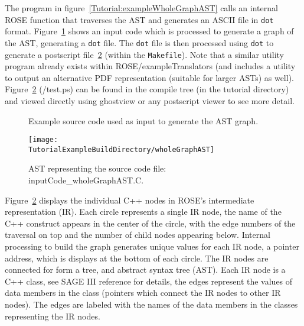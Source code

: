The program in figure~\ref{Tutorial:exampleWholeGraphAST} calls 
an internal ROSE function that traverses the AST and generates 
an ASCII file in {\tt dot} format.
Figure~\ref{Tutorial:exampleInputCode_WholeGraphAST} shows an input
code which is processed to generate a graph of the AST, generating a 
{\tt dot} file.   The {\tt dot} file is then processed
using {\tt dot} to generate a postscript file~\ref{tutorial:exampleOutputWholeGraphAST}
(within the {\tt Makefile}).
Note that a similar utility program already exists within ROSE/exampleTranslators
(and includes a utility to output an alternative PDF representation 
(suitable for larger ASTs) as well).  Figure~\ref{tutorial:exampleOutputWholeGraphAST}
(\TutorialExampleBuildDirectory/test.ps) can be found in the compile 
tree (in the tutorial directory) and viewed directly using ghostview 
or any postscript viewer to see more detail.


\begin{figure}[!h]
{\indent
{\mySmallFontSize

\begin{latexonly}
   
\end{latexonly}

\begin{htmlonly}
   
\end{htmlonly}

}
}
\caption{Example source code used as input to generate the AST graph.}
\label{Tutorial:exampleInputCode_WholeGraphAST}
\end{figure}

\begin{figure}
\texttt{[image: \\TutorialExampleBuildDirectory/wholeGraphAST]}
\caption{AST representing the source code file: inputCode\_wholeGraphAST.C.}
\label{tutorial:exampleOutputWholeGraphAST}
\end{figure}

   Figure~\ref{tutorial:exampleOutputWholeGraphAST} displays the individual
C++ nodes in ROSE's intermediate representation (IR).  Each circle represents
a single IR node, the name of the C++ construct appears in the center of the
circle, with the edge numbers of the traversal on top and the number of
child nodes appearing below.  Internal processing to build the graph generates
unique values for each IR node, a pointer address, which is displays at the bottom
of each circle.  The IR nodes are connected for form a tree, and abstract syntax
tree (AST). Each IR node is a C++ class, see SAGE III reference for details,
the edges represent the values of data members in the class (pointers which connect
the IR nodes to other IR nodes).  The edges are labeled with the names of the 
data members in the classes representing the IR nodes.


